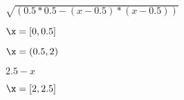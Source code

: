 \documentclass{article}
\begin{document}
$\sqrt{(0.5*0.5-(x-0.5)*(x-0.5))}$
\pagebreak

$\x=[0,0.5]$
\pagebreak

$\x=(0.5,2)$
\pagebreak

$ 2.5-x $
\pagebreak

$\x=[2,2.5]$
\pagebreak
\end{document}

